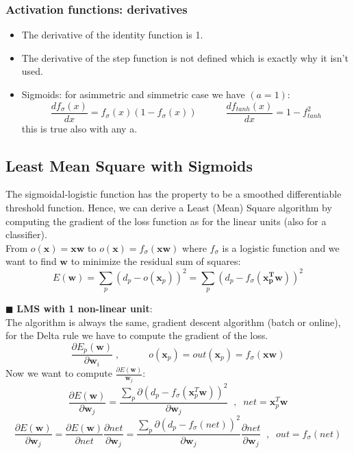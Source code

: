\documentclass[../main.tex]{subfiles}
\begin{document}
\subsubsection{Activation functions: derivatives}
\begin{itemize}
    \item The derivative of the identity function is 1.
    \item The derivative of the step function is not defined which is exactly why it isn't used.
    \item Sigmoids: for asimmetric and simmetric case we have $(a=1)$:
    $$ \frac{d f_\sigma (x)}{dx} = f_\sigma(x)(1 - f_\sigma (x)) \quad\quad\quad \frac{d f_{tanh} (x)}{dx} = 1 - f_{tanh}^2$$
    this is true also with any a.
\end{itemize}

\subsection{Least Mean Square with Sigmoids}
The sigmoidal-logistic function has the property to be a smoothed differentiable threshold function. Hence, we can derive a Least (Mean) Square algorithm by computing the gradient of the loss function as for the linear units (also for a classifier).\\

From $o(\mathbf{x})= \mathbf{xw}$ to $o(\mathbf{x})=f_\sigma(\mathbf{xw})$ where $f_\sigma$ is a logistic function and we want to find $\mathbf{w}$ to minimize the residual sum of squares:
$$ E(\mathbf{w}) = \sum_{p}^{}(d_p - o(\mathbf{x}_p))^2 = \sum_{p}^{} (d_p - f_\sigma(\mathbf{x_p^Tw}))^2$$

\noindent$\blacksquare$  \textbf{LMS with 1 non-linear unit}:\\
The algorithm is always the same, gradient descent algorithm (batch or online), for the Delta rule we have to compute the gradient of the loss.
$$\frac{\partial E_p(\mathbf{w})}{\partial\mathbf{w}_i}\;,\quad \quad \quad o(\mathbf{x}_p) = out(\mathbf{x}_p)  = f_\sigma(\mathbf{xw})$$
Now we want to compute $\frac{\partial E(\mathbf{w})}{\mathbf{w}_j}$:
$$\frac{\partial E(\mathbf{w})}{\partial \mathbf{w}_j} = \frac{ \sum_{p}^{} \partial(d_p - f_\sigma(\mathbf{x}_{p}^{T}\mathbf{w}))^2}{\partial \mathbf{w}_j}\;\;,\;\; net = \mathbf{x}_p^T \mathbf{w}$$
$$ \frac{\partial E(\mathbf{w})}{\partial \mathbf{w}_j} = \frac{\partial E(\mathbf{w})}{\partial net}\frac{\partial net}{\partial \mathbf{w}_j} = \frac{ \sum_{p}^{} \partial(d_p - f_\sigma(net))^2}{\partial \mathbf{w}_j} \frac{\partial net}{\partial \mathbf{w}_j}\;\;,\;\; out = f_\sigma(net) $$
\end{document}
